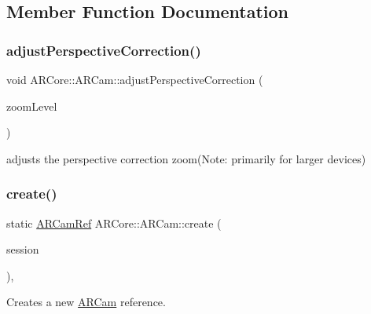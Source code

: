 \subsection{Member Function Documentation}
\mbox{\label{class_a_r_core_1_1_a_r_cam_ae2ecd3007e6684d1686c89d2ac3e7020}} 
\subsubsection{\texorpdfstring{adjust\+Perspective\+Correction()}{adjustPerspectiveCorrection()}}
{\footnotesize\ttfamily void A\+R\+Core\+::\+A\+R\+Cam\+::adjust\+Perspective\+Correction (\begin{DoxyParamCaption}\item[{float}]{zoom\+Level }\end{DoxyParamCaption})}



adjusts the perspective correction zoom(\+Note\+: primarily for larger devices) 

\mbox{\label{class_a_r_core_1_1_a_r_cam_ad4a6c0ebf786ea4e745cc8e95790681a}} 
\subsubsection{\texorpdfstring{create()}{create()}}
{\footnotesize\ttfamily static \mbox{\hyperlink{namespace_a_r_core_a4ebe9e23907235fcf76bf65440fde0e0}{A\+R\+Cam\+Ref}} A\+R\+Core\+::\+A\+R\+Cam\+::create (\begin{DoxyParamCaption}\item[{A\+R\+Session $\ast$}]{session }\end{DoxyParamCaption})\hspace{0.3cm}{\ttfamily [inline]}, {\ttfamily [static]}}



Creates a new \mbox{\hyperlink{class_a_r_core_1_1_a_r_cam}{A\+R\+Cam}} reference. 

\mbox{\label{class_a_r_core_1_1_a_r_cam_ac6506992ee88e0acd20d851849ebfa18}} 
